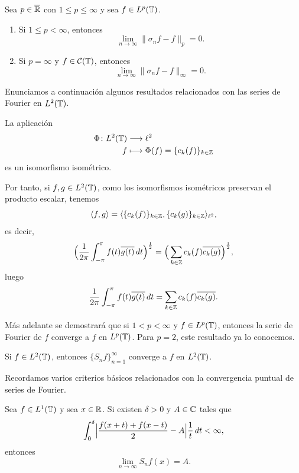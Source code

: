 \documentclass[a4paper, 12pt]{book}
\begin{document}
\begin{theorem}\label{1.2.6}
    Sea $p \in \overline{\mathbb R}$ con $1 \leq p \leq \infty$ y sea $f \in L^p(\mathbb T)$.
    \begin{enumerate}
        \item Si $1 \leq p < \infty$, entonces
        \[\lim_{n \to \infty} \|\sigma_nf - f\|_p = 0.\]
        \item Si $p = \infty$ y $f \in \mathcal{C}(\mathbb T)$, entonces
        \[\lim_{n \to \infty} \|\sigma_nf - f\|_\infty = 0.\]
    \end{enumerate}
\end{theorem}

Enunciamos a continuación algunos resultados relacionados con las series de Fourier en $L^2(\mathbb T)$.

\begin{theorem}
    La aplicación
    \begin{align*}
        \Phi \colon L^2(\mathbb T) &\longrightarrow \ell^2 \\
        f &\longmapsto \Phi(f) = \{c_k(f)\}_{k\in\mathbb Z}
    \end{align*}
    es un isomorfismo isométrico.
\end{theorem}

Por tanto, si $f,g \in L^2(\mathbb T)$, como los isomorfismos isométricos preservan el producto escalar, tenemos
\[\langle f,g \rangle = \langle \{c_k(f)\}_{k\in\mathbb Z}, \{c_k(g)\}_{k\in\mathbb Z} \rangle_{\ell^2},\]
es decir,
\[\Bigl(\frac{1}{2\pi}\int_{-\pi}^{\pi} f(t)\overline{g(t)} \, dt\Bigr)^{\frac{1}{2}} = \Bigl(\,\sum_{k\in\mathbb Z} c_k(f)\overline{c_k(g)}\Bigr)^{\frac{1}{2}},\]
luego
\begin{equation}\label{1.2.8}
    \frac{1}{2\pi}\int_{-\pi}^{\pi} f(t)\overline{g(t)} \, dt = \sum_{k\in\mathbb Z} c_k(f)\overline{c_k(g)}.
\end{equation}

Más adelante se demostrará que si $1<p<\infty$ y $f\in L^p(\mathbb T)$, entonces la serie de Fourier de $f$ converge a $f$ en $L^p(\mathbb T)$. Para $p=2$, este resultado ya lo conocemos.
\begin{theorem}
    Si $f \in L^2(\mathbb T)$, entonces $\{S_nf\}_{n=1}^\infty$ converge a $f$ en $L^2(\mathbb T)$.
\end{theorem}

Recordamos varios criterios básicos relacionados con la convergencia puntual de series de Fourier.

\begin{theorem}\label{1.2.10}
    Sea $f \in L^1(\mathbb T)$ y sea $x \in \mathbb R$. Si existen $\delta > 0$ y $A \in \mathbb C$ tales que
    \[\int_{0}^{\delta} \Bigl|\frac{f(x+t)+f(x-t)}{2}-A\Bigr|\frac{1}{t} \, dt < \infty,\]
    entonces
    \[\lim_{n\to\infty}S_nf(x) = A.\]
\end{theorem}
\end{document}
